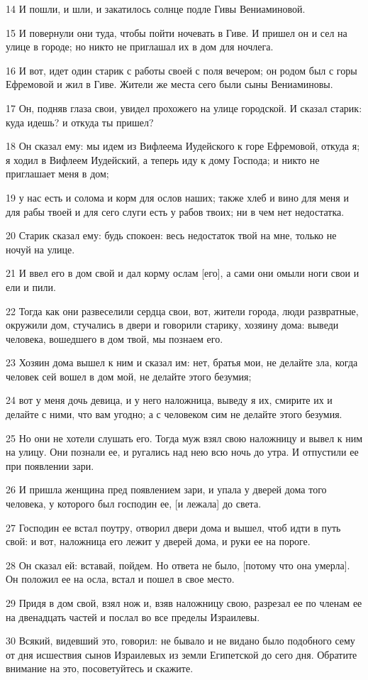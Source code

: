 \par 14 И пошли, и шли, и закатилось солнце подле Гивы Вениаминовой.
\par 15 И повернули они туда, чтобы пойти ночевать в Гиве. И пришел он и сел на улице в городе; но никто не приглашал их в дом для ночлега.
\par 16 И вот, идет один старик с работы своей с поля вечером; он родом был с горы Ефремовой и жил в Гиве. Жители же места сего были сыны Вениаминовы.
\par 17 Он, подняв глаза свои, увидел прохожего на улице городской. И сказал старик: куда идешь? и откуда ты пришел?
\par 18 Он сказал ему: мы идем из Вифлеема Иудейского к горе Ефремовой, откуда я; я ходил в Вифлеем Иудейский, а теперь иду к дому Господа; и никто не приглашает меня в дом;
\par 19 у нас есть и солома и корм для ослов наших; также хлеб и вино для меня и для рабы твоей и для сего слуги есть у рабов твоих; ни в чем нет недостатка.
\par 20 Старик сказал ему: будь спокоен: весь недостаток твой на мне, только не ночуй на улице.
\par 21 И ввел его в дом свой и дал корму ослам [его], а сами они омыли ноги свои и ели и пили.
\par 22 Тогда как они развеселили сердца свои, вот, жители города, люди развратные, окружили дом, стучались в двери и говорили старику, хозяину дома: выведи человека, вошедшего в дом твой, мы познаем его.
\par 23 Хозяин дома вышел к ним и сказал им: нет, братья мои, не делайте зла, когда человек сей вошел в дом мой, не делайте этого безумия;
\par 24 вот у меня дочь девица, и у него наложница, выведу я их, смирите их и делайте с ними, что вам угодно; а с человеком сим не делайте этого безумия.
\par 25 Но они не хотели слушать его. Тогда муж взял свою наложницу и вывел к ним на улицу. Они познали ее, и ругались над нею всю ночь до утра. И отпустили ее при появлении зари.
\par 26 И пришла женщина пред появлением зари, и упала у дверей дома того человека, у которого был господин ее, [и лежала] до света.
\par 27 Господин ее встал поутру, отворил двери дома и вышел, чтоб идти в путь свой: и вот, наложница его лежит у дверей дома, и руки ее на пороге.
\par 28 Он сказал ей: вставай, пойдем. Но ответа не было, [потому что она умерла]. Он положил ее на осла, встал и пошел в свое место.
\par 29 Придя в дом свой, взял нож и, взяв наложницу свою, разрезал ее по членам ее на двенадцать частей и послал во все пределы Израилевы.
\par 30 Всякий, видевший это, говорил: не бывало и не видано было подобного сему от дня исшествия сынов Израилевых из земли Египетской до сего дня. Обратите внимание на это, посоветуйтесь и скажите.

